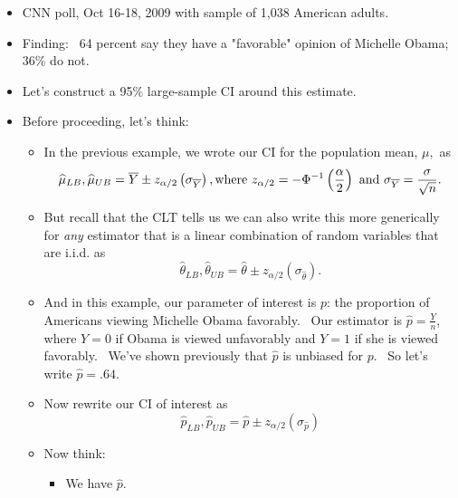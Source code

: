 \documentclass[11pt]{article}
\begin{document}
\begin{itemize}
\item CNN poll, Oct 16-18, 2009 with sample of 1,038 American adults.

\item Finding: \ 64 percent say they have a "favorable" opinion of Michelle
Obama; 36\% do not.\ 

\item Let's construct a 95\% large-sample CI around this estimate.

\item Before proceeding, let's think:

\begin{itemize}
\item In the previous example, we wrote our CI for the population mean, $\mu
,$ as%
\begin{equation*}
\widehat{\mu }_{LB},\widehat{\mu }_{UB}=\overline{Y}\pm z_{\alpha /2}\left(
\sigma _{\overline{Y}}\right) ,\text{where }z_{\alpha /2}=-\Phi ^{-1}\left( 
\frac{\alpha }{2}\right) \text{ and }\sigma _{\overline{Y}}=\frac{\sigma }{%
\sqrt{n}}.
\end{equation*}

\item But recall that the CLT tells us we can also write this more
generically for \textit{any }estimator that is a linear combination of
random variables that are i.i.d. as%
\begin{equation*}
\widehat{\theta }_{LB},\widehat{\theta }_{UB}=\widehat{\theta }\pm z_{\alpha
/2}\left( \sigma _{\widehat{\theta }}\right) .
\end{equation*}

\item And in this example, our parameter of interest is $p$: the proportion
of Americans viewing Michelle Obama favorably. \ Our estimator is $\widehat{p%
}=\frac{Y}{n}$, where $Y=0$ if Obama is viewed unfavorably and $Y=1$ if she
is viewed favorably. \ We've  shown previously that $\widehat{p}$ is
unbiased for $p$. \ So let's write $\widehat{p}=.64.$

\item Now rewrite our CI of interest as%
\begin{equation*}
\widehat{p}_{LB},\widehat{p}_{UB}=\widehat{p}\pm z_{\alpha /2}\left( \sigma
_{\widehat{p}}\right) 
\end{equation*}

\item Now think:

\begin{itemize}
\item We have $\widehat{p}.$


\end{itemize}
\end{itemize}
\end{itemize}
\end{document}
